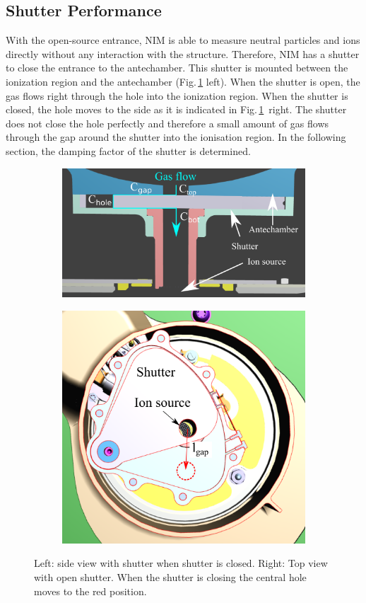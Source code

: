 	\subsection{Shutter Performance } \label{subsubsec:motorflow}
	With the open-source entrance, NIM is able to measure neutral particles and ions directly without any interaction with the structure. Therefore, NIM has a shutter to close the entrance to the antechamber. This shutter is mounted between the ionization region and the antechamber (Fig.\,\ref{fig:shutterMotor} left). When the shutter is open, the gas flows right through the hole into the ionization region. When the shutter is closed, the hole moves to the side as it is indicated in Fig.\,\ref{fig:shutterMotor}~right. The shutter does not close the hole perfectly and therefore a small amount of gas flows through the gap around the shutter into the ionisation region. In the following section, the damping factor of the shutter is determined.\\
	\begin{figure}[h!]
		\begin{subfigure}{0.5\textwidth}
			\centering
			\includegraphics[width=\textwidth]{Bilder/Shutter_sideview.png}
		\end{subfigure}
		\begin{subfigure}{0.5\textwidth}
			\centering
			\includegraphics[width=.8\textwidth]{Bilder/Shutter_topview.png}
		\end{subfigure}
	\caption{Left: side view with shutter when shutter is closed. Right: Top view with open shutter. When the shutter is closing the central hole moves to the red position.}
	\label{fig:shutterMotor}
	\end{figure}
